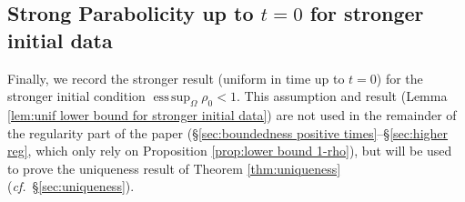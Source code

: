 \documentclass[11pt,a4paper,reqno]{amsart}
\theoremstyle{remark}
\theoremstyle{definition}
\numberwithin{equation}{section}
\DeclareMathOperator{\esssup}{ess \, sup}
\begin{document}
\subsection{Strong Parabolicity up to $t=0$ for stronger initial data}\label{subsec:strong parab up to t zero}

Finally, we record the stronger result (uniform in time up to $t=0$) for the stronger initial condition $\esssup_\Omega \rho_0 < 1$. This assumption and result (Lemma \ref{lem:unif lower bound for stronger initial data}) are not used in the remainder of the regularity part of the paper (\S \ref{sec:boundedness positive times}--\S \ref{sec:higher reg}, which only rely on Proposition \ref{prop:lower bound 1-rho}), but will be used to prove the uniqueness result of Theorem \ref{thm:uniqueness} (\textit{cf.}~\S \ref{sec:uniqueness}). 
\end{document}
